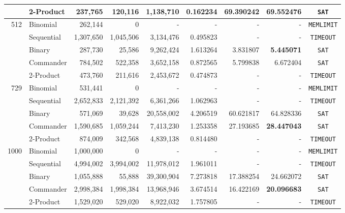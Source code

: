 \documentclass[a4paper,fleqn]{cas-sc}
\begin{document}
\begin{longtable}{r l r r r r r r c}
 & 2-Product & 237,765 & 120,116 & 1,138,710 & 0.162234 & 69.390242 & 69.552476 & \texttt{SAT} \\
\midrule
\multirow{5}{*}{512} 
 & Binomial & 262,144 & 0 & - & - & - & - & \texttt{MEMLIMIT} \\
 & Sequential & 1,307,650 & 1,045,506 & 3,134,476 & 0.495823 & - & - & \texttt{TIMEOUT} \\
 & Binary & 287,730 & 25,586 & 9,262,424 & 1.613264 & 3.831807 & \textbf{5.445071} & \texttt{SAT} \\
 & Commander & 784,502 & 522,358 & 3,652,158 & 0.872565 & 5.799838 & 6.672404 & \texttt{SAT} \\
 & 2-Product & 473,760 & 211,616 & 2,453,672 & 0.474873 & - & - & \texttt{TIMEOUT} \\
\midrule
\multirow{5}{*}{729} 
 & Binomial & 531,441 & 0 & - & - & - & - & \texttt{MEMLIMIT} \\
 & Sequential & 2,652,833 & 2,121,392 & 6,361,266 & 1.062963 & - & - & \texttt{TIMEOUT} \\
 & Binary & 571,069 & 39,628 & 20,558,002 & 4.206519 & 60.621817 & 64.828336 & \texttt{SAT} \\
 & Commander & 1,590,685 & 1,059,244 & 7,413,230 & 1.253358 & 27.193685 & \textbf{28.447043} & \texttt{SAT} \\
 & 2-Product & 874,009 & 342,568 & 4,839,138 & 0.814480 & - & - & \texttt{TIMEOUT} \\
\midrule
\multirow{5}{*}{1000} 
 & Binomial & 1,000,000 & 0 & - & - & - & - & \texttt{MEMLIMIT} \\
 & Sequential & 4,994,002 & 3,994,002 & 11,978,012 & 1.961011 & - & - & \texttt{TIMEOUT} \\
 & Binary & 1,055,888 & 55,888 & 39,300,904 & 7.273818 & 17.388254 & 24.662072 & \texttt{SAT} \\
 & Commander & 2,998,384 & 1,998,384 & 13,968,946 & 3.674514 & 16.422169 & \textbf{20.096683} & \texttt{SAT} \\
 & 2-Product & 1,529,020 & 529,020 & 8,922,032 & 1.757805 & - & - & \texttt{TIMEOUT} \\
\end{longtable}
\endgroup
\end{document}
